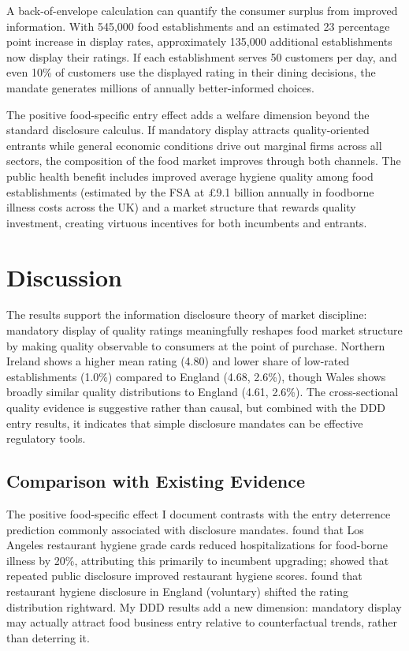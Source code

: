 \documentclass[12pt]{article}
\begin{document}
A back-of-envelope calculation can quantify the consumer surplus from improved information. With 545,000 food establishments and an estimated 23 percentage point increase in display rates, approximately 135,000 additional establishments now display their ratings. If each establishment serves 50 customers per day, and even 10\% of customers use the displayed rating in their dining decisions, the mandate generates millions of annually better-informed choices.

The positive food-specific entry effect adds a welfare dimension beyond the standard disclosure calculus. If mandatory display attracts quality-oriented entrants while general economic conditions drive out marginal firms across all sectors, the composition of the food market improves through both channels. The public health benefit includes improved average hygiene quality among food establishments (estimated by the FSA at £9.1 billion annually in foodborne illness costs across the UK) and a market structure that rewards quality investment, creating virtuous incentives for both incumbents and entrants.


\section{Discussion}
\label{sec:discussion}

The results support the information disclosure theory of market discipline: mandatory display of quality ratings meaningfully reshapes food market structure by making quality observable to consumers at the point of purchase. Northern Ireland shows a higher mean rating (4.80) and lower share of low-rated establishments (1.0\%) compared to England (4.68, 2.6\%), though Wales shows broadly similar quality distributions to England (4.61, 2.6\%). The cross-sectional quality evidence is suggestive rather than causal, but combined with the DDD entry results, it indicates that simple disclosure mandates can be effective regulatory tools.

\subsection{Comparison with Existing Evidence}

The positive food-specific effect I document contrasts with the entry deterrence prediction commonly associated with disclosure mandates. \citet{jin2003effect} found that Los Angeles restaurant hygiene grade cards reduced hospitalizations for food-borne illness by 20\%, attributing this primarily to incumbent upgrading; \citet{jin2005impact} showed that repeated public disclosure improved restaurant hygiene scores. \citet{ho2012does} found that restaurant hygiene disclosure in England (voluntary) shifted the rating distribution rightward. My DDD results add a new dimension: mandatory display may actually attract food business entry relative to counterfactual trends, rather than deterring it.
\end{document}
